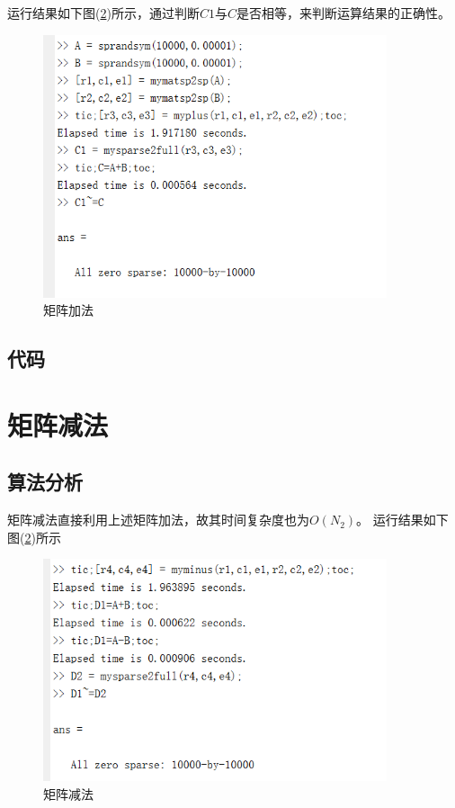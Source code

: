 \documentclass[a4paper,left=2.5cm,right=2.5cm]{article}
\begin{document}
\begin{spacing}{1.6}
		运行结果如下图(\ref{plus})所示，通过判断$C1$与$C$是否相等，来判断运算结果的正确性。
		\begin{figure}[H]
			\includegraphics[width=0.9\textwidth]{image/plus.png}
			\caption{矩阵加法}
			\label{plus}
		\end{figure}
		\subsection{代码}
		
		\section{矩阵减法}
		\subsection{算法分析}
		矩阵减法直接利用上述矩阵加法，故其时间复杂度也为$O(N_2)$。
		运行结果如下图(\ref{plus})所示
		\begin{figure}[H]
			\includegraphics[width=0.9\textwidth]{image/minus_result.png}
			\caption{矩阵减法}
			\label{plus}
		\end{figure}

\end{spacing}
\end{document}

